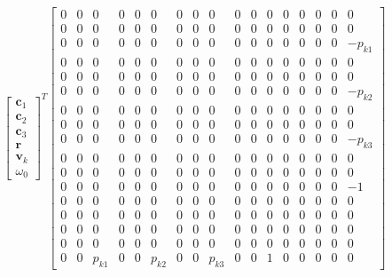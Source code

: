 \documentclass{article}
\begin{document}
\begin{align}
    \begin{bmatrix}
        \mathbf{c}_1 \\
        \mathbf{c}_2 \\
        \mathbf{c}_3 \\
        \mathbf{r} \\
        \mathbf{v}_k \\
        \omega_0
    \end{bmatrix}^T 
    \begin{bmatrix}
        0 & 0 & 0 & 0 & 0 & 0 & 0 & 0 & 0 & 0 & 0 & 0 & 0 & 0 & 0 & 0 & 0 \\
        0 & 0 & 0 & 0 & 0 & 0 & 0 & 0 & 0 & 0 & 0 & 0 & 0 & 0 & 0 & 0 & 0 \\
        0 & 0 & 0 & 0 & 0 & 0 & 0 & 0 & 0 & 0 & 0 & 0 & 0 & 0 & 0 & 0 & -p_{k1} \\
        0 & 0 & 0 & 0 & 0 & 0 & 0 & 0 & 0 & 0 & 0 & 0 & 0 & 0 & 0 & 0 & 0 \\
        0 & 0 & 0 & 0 & 0 & 0 & 0 & 0 & 0 & 0 & 0 & 0 & 0 & 0 & 0 & 0 & 0 \\
        0 & 0 & 0 & 0 & 0 & 0 & 0 & 0 & 0 & 0 & 0 & 0 & 0 & 0 & 0 & 0 & -p_{k2} \\
        0 & 0 & 0 & 0 & 0 & 0 & 0 & 0 & 0 & 0 & 0 & 0 & 0 & 0 & 0 & 0 & 0 \\
        0 & 0 & 0 & 0 & 0 & 0 & 0 & 0 & 0 & 0 & 0 & 0 & 0 & 0 & 0 & 0 & 0 \\
        0 & 0 & 0 & 0 & 0 & 0 & 0 & 0 & 0 & 0 & 0 & 0 & 0 & 0 & 0 & 0 & -p_{k3} \\
        0 & 0 & 0 & 0 & 0 & 0 & 0 & 0 & 0 & 0 & 0 & 0 & 0 & 0 & 0 & 0 & 0 \\
        0 & 0 & 0 & 0 & 0 & 0 & 0 & 0 & 0 & 0 & 0 & 0 & 0 & 0 & 0 & 0 & 0 \\
        0 & 0 & 0 & 0 & 0 & 0 & 0 & 0 & 0 & 0 & 0 & 0 & 0 & 0 & 0 & 0 & -1 \\
        0 & 0 & 0 & 0 & 0 & 0 & 0 & 0 & 0 & 0 & 0 & 0 & 0 & 0 & 0 & 0 & 0 \\
        0 & 0 & 0 & 0 & 0 & 0 & 0 & 0 & 0 & 0 & 0 & 0 & 0 & 0 & 0 & 0 & 0 \\
        0 & 0 & 0 & 0 & 0 & 0 & 0 & 0 & 0 & 0 & 0 & 0 & 0 & 0 & 0 & 0 & 0 \\
        0 & 0 & 0 & 0 & 0 & 0 & 0 & 0 & 0 & 0 & 0 & 0 & 0 & 0 & 0 & 0 & 0 \\
        0 & 0 & p_{k1} & 0 & 0 & p_{k2} & 0 & 0 & p_{k3} & 0 & 0 & 1 & 0 & 0 & 0 & 0 & 0
    \end{bmatrix}

\end{align}
\end{document}
